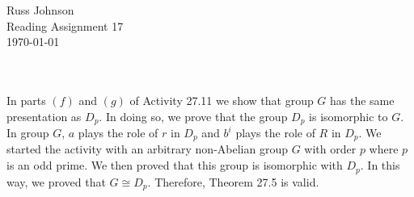 \documentclass[11pt,a4paper]{article}
\begin{document}
\begin{flushright}
Russ Johnson\\
Reading Assignment 17\\
\today\\
\end{flushright}
~\\
~\\
In parts $(f)$ and $(g)$ of Activity 27.11 we show that group $G$ has the same presentation as $D_p$. In doing so, we prove that the group $D_p$ is isomorphic to $G$. In group $G$, $a$ plays the role of $r$ in $D_p$ and $b^i$ plays the role of $R$ in $D_p$. We started the activity with an arbitrary non-Abelian group $G$ with order $p$ where $p$ is an odd prime. We then proved that this group is isomorphic with $D_p$. In this way, we proved that $G\cong D_p$. Therefore, Theorem 27.5 is valid.
\end{document}

